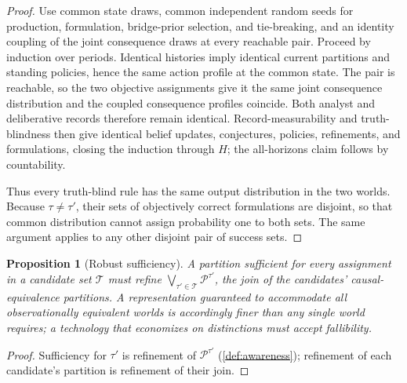 \documentclass[11pt]{article}
\newtheorem{proposition}[assumption]{Proposition}
\theoremstyle{definition}
\begin{document}
\begin{proof}
Use common state draws, common independent random seeds for production, formulation, bridge-prior selection, and tie-breaking, and an identity coupling of the joint consequence draws at every reachable pair.
Proceed by induction over periods.
Identical histories imply identical current partitions and standing policies, hence the same action profile at the common state.
The pair is reachable, so the two objective assignments give it the same joint consequence distribution and the coupled consequence profiles coincide.
Both analyst and deliberative records therefore remain identical.
Record-measurability and truth-blindness then give identical belief updates, conjectures, policies, refinements, and formulations, closing the induction through $H$; the all-horizons claim follows by countability.

Thus every truth-blind rule has the same output distribution in the two worlds.
Because $\tau\neq\tau'$, their sets of objectively correct formulations are disjoint, so that common distribution cannot assign probability one to both sets.
The same argument applies to any other disjoint pair of success sets.
\end{proof}

\begin{proposition}[Robust sufficiency]
\label{prop:robust-sufficiency}
A partition sufficient for every assignment in a candidate set $\mathcal T$ must refine $\bigvee_{\tau'\in\mathcal T}\mathcal P^{\tau'}$, the join of the candidates' causal-equivalence partitions.
A representation guaranteed to accommodate all observationally equivalent worlds is accordingly finer than any single world requires; a technology that economizes on distinctions must accept fallibility.
\end{proposition}

\begin{proof}
Sufficiency for $\tau'$ is refinement of $\mathcal P^{\tau'}$ (\cref{def:awareness}); refinement of each candidate's partition is refinement of their join.
\end{proof}
\end{document}
